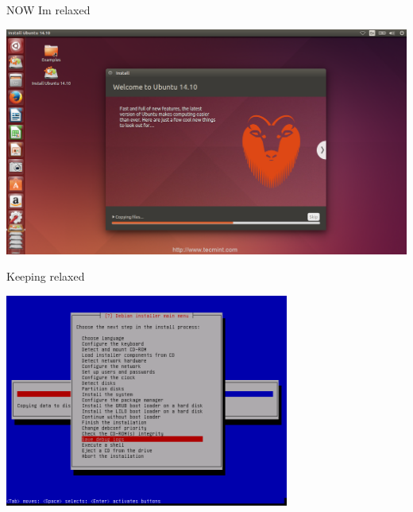 \documentclass{beamer}
\begin{document}
\begin{frame}{NOW Im relaxed}
\begin{center}
\includegraphics[width=\textwidth]{install.png}
\end{center}
\end {frame}


\begin{frame}{Keeping relaxed}{}
\begin{center}
\includegraphics[height=7cm,keepaspectratio]{installconsole.png}
\end{center}
\end {frame}
\end{document}

